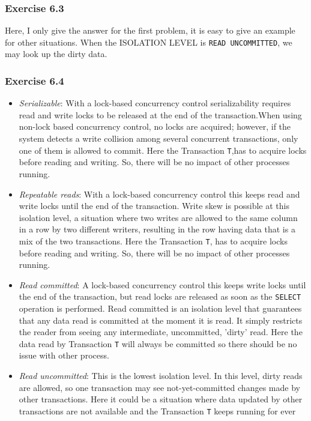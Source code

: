 \documentclass[../../main.tex]{subfiles}
\begin{document}
\subsubsection*{Exercise 6.3}

Here, I only give the answer for the first problem, it is easy to give an example for
other situations. When the ISOLATION LEVEL is \verb|READ UNCOMMITTED|, we may look up
the dirty data.

\subsubsection*{Exercise 6.4}

\begin{itemize}
  \item \emph{Serializable}: With a lock-based concurrency control serializability requires read and write
        locks to be released at the end of the transaction.When using non-lock based
        concurrency control, no locks are acquired; however, if the system detects a
        write collision among several concurrent transactions, only one of them is
        allowed to commit. Here the Transaction \verb|T|,has to acquire locks before reading
        and writing. So, there will be no impact of other processes running.
  \item \emph{Repeatable reads}: With a lock-based concurrency control this keeps read and write locks
        until the end of the transaction. Write skew is possible at this isolation level, a situation
        where two writes are allowed to the same column in a row by two different writers, resulting
        in the row having data that is a mix of the two transactions. Here the Transaction \verb|T|,
        has to acquire locks before reading and writing. So, there will be no impact of other
        processes running.
  \item \emph{Read committed}: A lock-based concurrency control this keeps write locks until the end
        of the transaction, but read locks are released as soon as the \verb|SELECT| operation is performed.
        Read committed is an isolation level that guarantees that any data read is committed at the
        moment it is read. It simply restricts the reader from seeing any intermediate,
        uncommitted, 'dirty' read. Here the data read by Transaction \verb|T| will always be committed so
        there should be no issue with other process.
  \item \emph{Read uncommitted}: This is the lowest isolation level. In this level, dirty reads
        are allowed, so one transaction may see not-yet-committed changes made by other transactions.
        Here it could be a situation where data updated by other transactions are not available
        and the Transaction \verb|T| keeps running for ever
\end{itemize}
\end{document}
